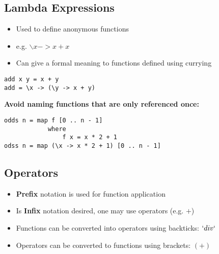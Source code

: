 \subsection{Lambda Expressions}
\begin{itemize}
    \item Used to define anonymous functions
    \item e.g. $\backslash x -> x + x$
    \item Can give a formal meaning to functions defined using currying
\end{itemize}
\begin{lstlisting}
add x y = x + y
add = \x -> (\y -> x + y)
\end{lstlisting}
\textbf{Avoid naming functions that are only referenced once:}
\begin{lstlisting}
odds n = map f [0 .. n - 1]
            where
                f x = x * 2 + 1
odss n = map (\x -> x * 2 + 1) [0 .. n - 1]
\end{lstlisting}

\subsection{Operators}
\begin{itemize}
    \item \textbf{Prefix} notation is used for function application
    \item Is \textbf{Infix} notation desired, one may use operators (e.g. $+$)
    \item Functions can be converted into operators using backticks: $`div`$
    \item Operators can be converted to functions using brackets: $(+)$
\end{itemize}












